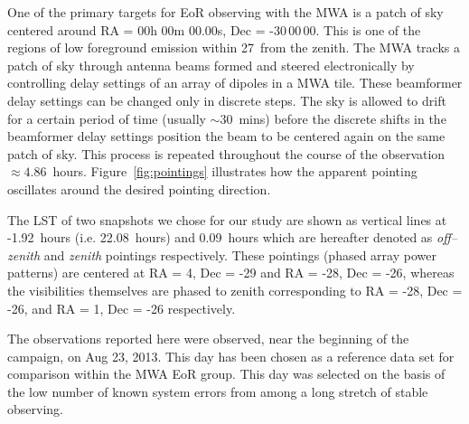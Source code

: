 \documentclass[preprint2,iop,numberedappendix]{emulateapj}
\begin{document}
One of the primary targets for EoR observing with the MWA is a patch of sky centered around RA = 00h 00m 00.00s, Dec = -30\arcdeg$\,$00\arcmin$\,$00. This is one of the regions of low foreground emission within 27\arcdeg$\,$ from the zenith. The MWA tracks a patch of sky through antenna beams formed and steered electronically by controlling delay settings of an array of dipoles in a MWA tile. These beamformer delay settings can be changed only in discrete steps.   The sky is allowed to drift for a certain period of time (usually $\sim 30$~mins) before the discrete shifts in the beamformer delay settings position the beam to be centered again on the same patch of sky. This process is repeated throughout the course of the observation $\approx 4.86$~hours. Figure~\ref{fig:pointings} illustrates how the apparent pointing oscillates around the desired pointing direction. 

The LST of two snapshots we chose for our study are shown as vertical lines at -1.92~hours (i.e.  22.08~hours) and 0.09~hours which are hereafter denoted as {\it off--zenith} and {\it zenith} pointings respectively. These pointings (phased array power patterns) are centered at RA = 4, Dec = -29 and RA = -28, Dec = -26, whereas the visibilities themselves are phased to zenith corresponding to RA = -28, Dec = -26, and RA = 1, Dec = -26 respectively.   

The observations reported here were observed, near the beginning of the campaign, on Aug 23, 2013.  This day has been chosen as a reference data set for comparison within the MWA EoR group. This day was selected on the basis of the low number of known system errors from among a long stretch of stable observing.
\end{document}
